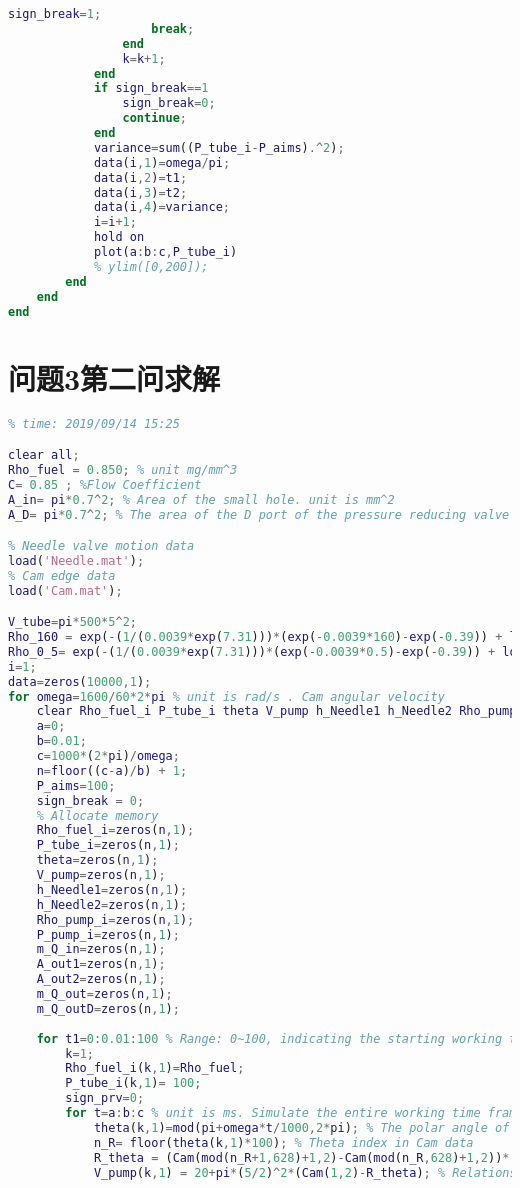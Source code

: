 \documentclass[withoutpreface,bwprint]{cumcmthesis} %
\begin{document}
\begin{appendices}
\begin{lstlisting}[language=matlab]
                    sign_break=1;
                    break;
                end
                k=k+1;
            end
            if sign_break==1
                sign_break=0;
                continue;
            end
            variance=sum((P_tube_i-P_aims).^2);
            data(i,1)=omega/pi;
            data(i,2)=t1;
            data(i,3)=t2;
            data(i,4)=variance;
            i=i+1;
            hold on
            plot(a:b:c,P_tube_i)
            % ylim([0,200]);
        end
    end
end
\end{lstlisting}

\section{问题3第二问求解} 
\begin{lstlisting}[language=matlab]
% 2019_A Q3_2_4th
% time: 2019/09/14 15:25

clear all;
Rho_fuel = 0.850; % unit mg/mm^3
C= 0.85 ; %Flow Coefficient
A_in= pi*0.7^2; % Area of the small hole. unit is mm^2
A_D= pi*0.7^2; % The area of the D port of the pressure reducing valve

% Needle valve motion data
load('Needle.mat');
% Cam edge data
load('Cam.mat');

V_tube=pi*500*5^2;
Rho_160 = exp(-(1/(0.0039*exp(7.31)))*(exp(-0.0039*160)-exp(-0.39)) + log(0.85)); % Fuel density at a pressure of 160 MPa
Rho_0_5= exp(-(1/(0.0039*exp(7.31)))*(exp(-0.0039*0.5)-exp(-0.39)) + log(0.85)); % Fuel density at a pressure of 0.5 MPa
i=1;
data=zeros(10000,1);
for omega=1600/60*2*pi % unit is rad/s . Cam angular velocity
    clear Rho_fuel_i P_tube_i theta V_pump h_Needle1 h_Needle2 Rho_pump_i P_pump_i m_Q_in A_out1 A_out2 m_Q_out m_Q_outD
    a=0;
    b=0.01;
    c=1000*(2*pi)/omega;
    n=floor((c-a)/b) + 1;
    P_aims=100;
    sign_break = 0;
    % Allocate memory
    Rho_fuel_i=zeros(n,1);
    P_tube_i=zeros(n,1);
    theta=zeros(n,1);
    V_pump=zeros(n,1);
    h_Needle1=zeros(n,1);
    h_Needle2=zeros(n,1);
    Rho_pump_i=zeros(n,1);
    P_pump_i=zeros(n,1);
    m_Q_in=zeros(n,1);
    A_out1=zeros(n,1);
    A_out2=zeros(n,1);
    m_Q_out=zeros(n,1);
    m_Q_outD=zeros(n,1);
    
    for t1=0:0.01:100 % Range: 0~100, indicating the starting working time of the injector during the period T=100ms.
        k=1;
        Rho_fuel_i(k,1)=Rho_fuel;
        P_tube_i(k,1)= 100;
        sign_prv=0;
        for t=a:b:c % unit is ms. Simulate the entire working time frame
            theta(k,1)=mod(pi+omega*t/1000,2*pi); % The polar angle of the current moment cam. (unit is rad)
            n_R= floor(theta(k,1)*100); % Theta index in Cam data
            R_theta = (Cam(mod(n_R+1,628)+1,2)-Cam(mod(n_R,628)+1,2))*(theta(k,1)*100-n_R)+Cam(mod(n_R,628)+1,2) ; % The diameter of the current moment cam. (unit is mm)
            V_pump(k,1) = 20+pi*(5/2)^2*(Cam(1,2)-R_theta); % Relationship between oil pump volume and pole diameter.


\end{lstlisting}
\end{appendices}
\end{document}
